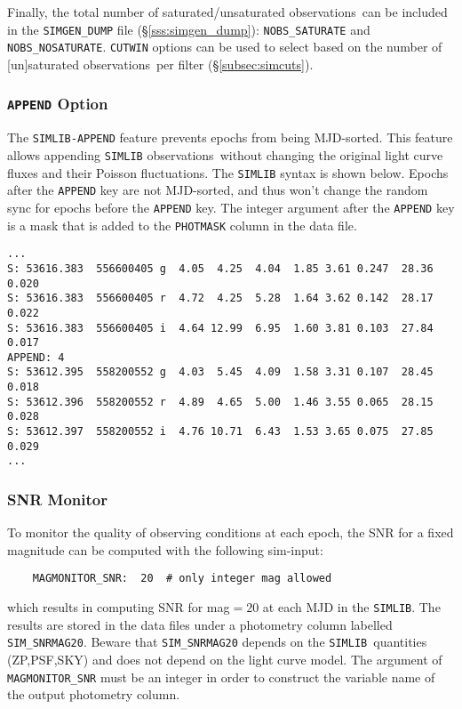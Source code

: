 \documentclass[12pt]{article}
\newcommand{\simlib}{{\tt SIMLIB}}
\newcommand{\obss}{observations}
\begin{document}
{\medskip Finally, the total number of saturated/unsaturated
\obss\ can be included in the {\tt SIMGEN\_DUMP} file
(\S\ref{sss:simgen_dump}):
{\tt NOBS\_SATURATE} and {\tt NOBS\_NOSATURATE}.
{\tt CUTWIN} options can be used to select based on
the number of [un]saturated \obss\ per filter
(\S\ref{subsec:simcuts}).


\clearpage
\subsubsection{{\tt APPEND} Option}
\label{sssec:simlib_append}

The {\tt SIMLIB-APPEND} feature prevents epochs from 
being MJD-sorted. This feature allows appending {\tt SIMLIB}
\obss\ without changing the original light curve fluxes
and their Poisson fluctuations.
The {\tt SIMLIB} syntax is shown below. Epochs after the
{\tt APPEND} key are not MJD-sorted, and thus won't change
the random sync for epochs before the {\tt APPEND} key.
The integer argument after the {\tt APPEND} key is a mask
that is added to the {\tt PHOTMASK} column in the data file.

\begin{Verbatim}[frame=single]
...
S: 53616.383  556600405 g  4.05  4.25  4.04  1.85 3.61 0.247  28.36  0.020 
S: 53616.383  556600405 r  4.72  4.25  5.28  1.64 3.62 0.142  28.17  0.022 
S: 53616.383  556600405 i  4.64 12.99  6.95  1.60 3.81 0.103  27.84  0.017 
APPEND: 4
S: 53612.395  558200552 g  4.03  5.45  4.09  1.58 3.31 0.107  28.45  0.018 
S: 53612.396  558200552 r  4.89  4.65  5.00  1.46 3.55 0.065  28.15  0.028 
S: 53612.397  558200552 i  4.76 10.71  6.43  1.53 3.65 0.075  27.85  0.029 
...
\end{Verbatim}


\subsubsection{SNR Monitor}
\label{sssec:SNRMON}

To monitor the quality of observing conditions at each epoch,
the SNR for a fixed magnitude can be computed with the 
following sim-input:
\begin{verbatim}
    MAGMONITOR_SNR:  20  # only integer mag allowed
\end{verbatim}   
%
which results in computing SNR for mag$=20$ at each MJD in the \simlib.
The results are stored in the data files under a photometry column 
labelled {\tt SIM\_SNRMAG20}.
Beware that {\tt SIM\_SNRMAG20} depends on the \simlib\
quantities (ZP,PSF,SKY) and does not depend on the light curve model.
The argument of {\tt MAGMONITOR\_SNR} must be an integer in order
to construct the variable name of the output photometry column.

}
\end{document}
